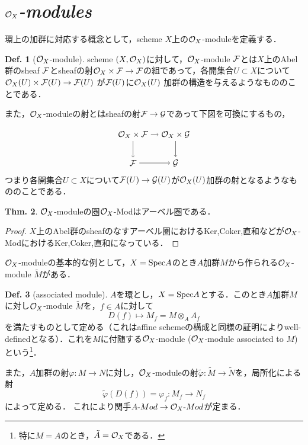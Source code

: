 \documentclass[dvipdfmx,b5paper,papersize]{jsarticle}
\theoremstyle{definition}
\newtheorem{thm}{Thm.}
\newtheorem{defi}[thm]{Def.}
\begin{document}
\section{${\cal{O}}_{X}$\it{-modules}}
環上の加群に対応する概念として，scheme $X$上の${\cal{O}}_{X}$-moduleを定義する．
\begin{defi}[${\cal{O}}_X$-module]
  scheme $(X,{\cal{O}}_X)$に対して，${\cal{O}}_X$-module $\cal{F}$とは$X$上のAbel群のsheaf $\cal{F}$とsheafの射${\cal{O}}_X \times \cal{F} \to \cal{F}$の組であって，各開集合$U \subset X$について${\cal{O}}_X(U)\times{\cal{F}}(U)\to{\cal{F}}(U)$
  が${\cal{F}}(U)$に${\cal{O}}_X(U)$
  加群の構造を与えるようなもののことである．

  また，${\cal{O}}_X$-moduleの射とはsheafの射$\cal{F} \to \cal{G}$であって下図を可換にするもの，

  \[
    \begin{tikzpicture}[auto,->]
      \node (a) at (0,1.2) {${\cal{O}}_X \times \cal{F}$}; \node (x) at (1.8,1.2) {${\cal{O}}_X \times \cal{G}$};
      \node (b) at (0,0) {$\cal{F}$}; \node (y) at (1.8,0) {$\cal{G}$};
      \draw (a) -- node {$\scriptstyle $} (x);
      \draw (x) -- node {$\scriptstyle $} (y);
      \draw (a) -- node[swap] {$\scriptstyle $} (b);
      \draw (b) -- node[swap] {$\scriptstyle $} (y);
    \end{tikzpicture}
  \]
  つまり各開集合$U \subset X$について${\cal{F}}(U) \to {\cal{G}}(U)$が${{\cal{O}}_X}(U)$加群の射となるようなもののことである．

\end{defi}


\begin{thm}
  ${\cal{O}}_X$-moduleの圏${\cal{O}}_X$-Modはアーベル圏である．
\end{thm}

\begin{proof}
  $X$上のAbel群のsheafのなすアーベル圏におけるKer,Coker,直和などが${\cal{O}}_X$-ModにおけるKer,Coker,直和になっている．

\end{proof}
${\cal{O}}_{X}$-moduleの基本的な例として，$X={\rm Spec}A$のとき$A$加群$M$から作られる${\cal{O}}_{X}$-module ${\tilde M}$がある．
\begin{defi}[associated module]
  $A$を環とし，$X={\rm Spec}A$とする．このとき$A$加群$M$に対し${\cal{O}}_X$-module ${\tilde M}$を，$f \in A$に対して
  \[
    D(f) \longmapsto M_f=M \otimes _A A_f
  \]
  を満たすものとして定める（これはaffine schemeの構成と同様の証明によりwell-definedとなる）．これを$M$に付随する${\cal{O}}_X$-module (${\cal{O}}_X$-module associated to $M$)という\footnote{特に$M=A$のとき，${\tilde A}={\cal{O}}_X$である．}．

  また，$A$加群の射$\varphi :M \to N$に対し，${\cal{O}}_X$-moduleの射${\tilde \varphi :\tilde M \to \tilde N}$を，局所化による射
  \[
    \tilde \varphi (D(f)) = \varphi _f : M_f \to N_f
  \]
  によって定める．
  これにより関手$A\mathchar`-Mod \to {\cal{O}}_{X}\mathchar`-Mod$が定まる．
\end{defi}
\end{document}
